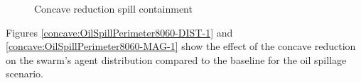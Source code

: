 \begin{figure}[H]
\centering
{}
\caption{Concave reduction spill containment}
\label{fig:VoidConcaveReduction}
\end{figure}

Figures \ref{concave:OilSpillPerimeter8060-DIST-1} and \ref{concave:OilSpillPerimeter8060-MAG-1} show the effect of the concave reduction on the swarm's agent distribution compared to the baseline for the oil spillage scenario. 

